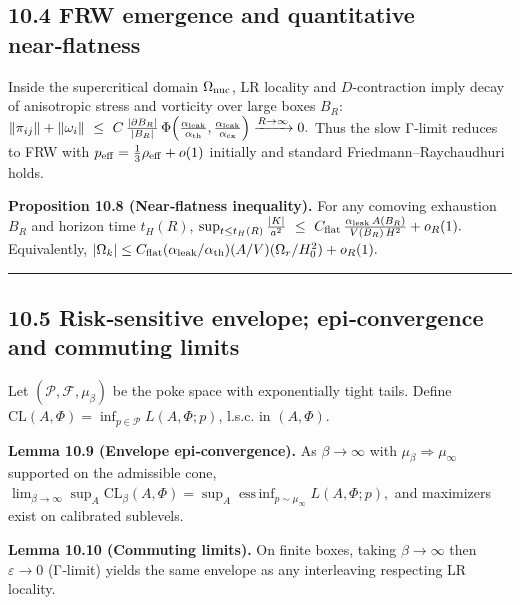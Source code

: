 \documentclass[
]{article}
\numberwithin{equation}{section}
\begin{document}
\hypertarget{frw-emergence-and-quantitative-nearflatness}{%
\subsection{10.4 FRW emergence and quantitative
near‑flatness}\label{frw-emergence-and-quantitative-nearflatness}}

Inside the supercritical domain \(\Omega_{\rm nuc}\), LR locality and
\(D\)-contraction imply decay of anisotropic stress and vorticity over
large boxes \(B_R\):
\(\|\pi_{ij}\|+\|\omega_i\|\ \le\ C\,\frac{|\partial B_R|}{|B_R|}\,\Phi\!\left(\tfrac{\alpha_{\rm leak}}{\alpha_{\rm th}},\tfrac{\alpha_{\rm leak}}{\alpha_{\rm cx}}\right)\xrightarrow{R\to\infty}0.\)
Thus the slow Γ‑limit reduces to FRW with
\(p_{\rm eff}=\tfrac13\rho_{\rm eff}+o(1)\) initially and standard
Friedmann--Raychaudhuri holds.

\textbf{Proposition 10.8 (Near‑flatness inequality).} For any comoving
exhaustion \(B_R\) and horizon time \(t_H(R)\),
\(\sup_{t\le t_H(R)}\frac{|K|}{a^2}\ \le\ C_{\rm flat}\,\frac{\alpha_{\rm leak}\,A(B_R)}{V(B_R)\,H^2}+o_R(1).\)
Equivalently,
\(|\Omega_k|\le C_{\rm flat}(\alpha_{\rm leak}/\alpha_{\rm th})(A/V)(\Omega_r/H_0^2)+o_R(1).\)

\begin{center}\rule{0.5\linewidth}{0.5pt}\end{center}

\hypertarget{risksensitive-envelope-epiconvergence-and-commuting-limits}{%
\subsection{10.5 Risk‑sensitive envelope; epi‑convergence and commuting
limits}\label{risksensitive-envelope-epiconvergence-and-commuting-limits}}

Let \((\mathcal P,\mathcal F,\mu_\beta)\) be the poke space with
exponentially tight tails. Define
\(\mathrm{CL}(A,\Phi)=\inf_{p\in\mathcal P}L(A,\Phi;p)\), l.s.c. in
\((A,\Phi)\).

\textbf{Lemma 10.9 (Envelope epi‑convergence).} As \(\beta\to\infty\)
with \(\mu_\beta\Rightarrow\mu_\infty\) supported on the admissible
cone,
\(\lim_{\beta\to\infty}\sup_A \mathrm{CL}_\beta(A,\Phi)=\sup_A\operatorname*{ess\,inf}_{p\sim\mu_\infty}L(A,\Phi;p),\)
and maximizers exist on calibrated sublevels.

\textbf{Lemma 10.10 (Commuting limits).} On finite boxes, taking
\(\beta\to\infty\) then \(\varepsilon\to0\) (Γ‑limit) yields the same
envelope as any interleaving respecting LR locality.
\end{document}
